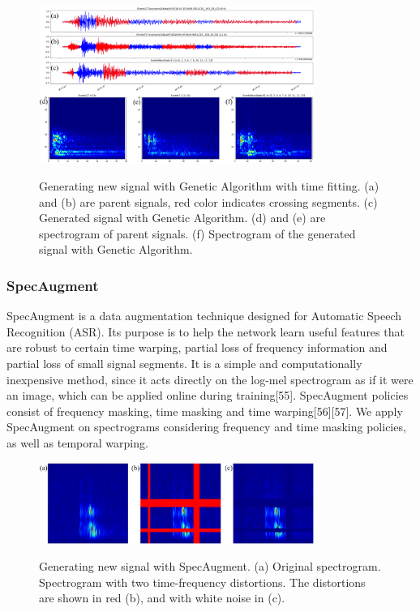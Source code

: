 \documentclass[journal]{IEEEtran}
\begin{document}
\begin{figure}
\centering
{\includegraphics[width=0.8\textwidth,keepaspectratio]{img/da_ag2.png}}
\caption{Generating new signal with Genetic Algorithm with time fitting. (a) and (b) are parent signals, red color indicates crossing segments. (c) Generated signal with Genetic Algorithm. (d) and (e) are spectrogram of parent signals. (f) Spectrogram of the generated signal with Genetic Algorithm.}
\label{fig:da_ga2}
\end{figure}

\subsubsection{SpecAugment}
SpecAugment is a data augmentation technique designed for Automatic Speech Recognition (ASR).  Its purpose is to help the network learn useful features that are robust to certain time warping, partial loss of frequency information and partial loss of small signal segments.  It is a simple and computationally inexpensive method, since it acts directly on the log-mel spectrogram as if it were an image, which can be applied online during training[55].
SpecAugment policies consist of frequency masking, time masking and time warping[56][57]. 
We apply SpecAugment on spectrograms considering frequency and time masking policies, as well as temporal warping.
\begin{figure}
\centering
{\includegraphics[width=0.8\textwidth,keepaspectratio]{img/da_specaugment.png}}
\caption{Generating new signal with SpecAugment. (a) Original spectrogram. Spectrogram with two time-frequency distortions. The distortions are shown in red (b), and with white noise in (c).}
\label{fig:da_specaugment}
\end{figure}
\end{document}
